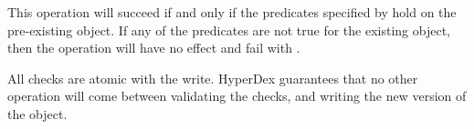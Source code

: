 This operation will succeed if and only if the predicates specified by
 hold on the pre-existing object.  If any of the predicates are not
true for the existing object, then the operation will have no effect and fail
with .

All checks are atomic with the write.  HyperDex guarantees that no other
operation will come between validating the checks, and writing the new version
of the object.
